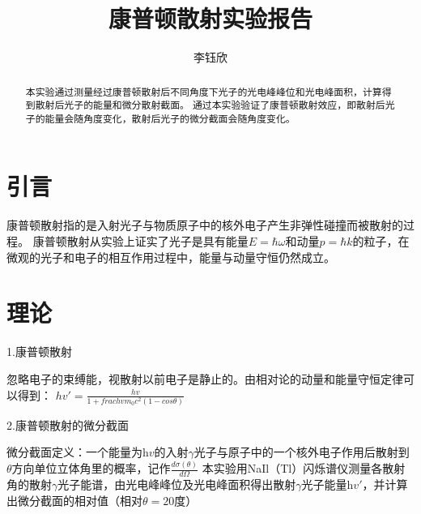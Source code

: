 \documentclass[font=default]{mpltx}
\makeatletter
\newcommand\releasedate{%
    \href{https://github.com/CastleStar14654/PKUMpLtX/releases/tag/\mpltx@fileversion}%
        {\mpltx@filedate, \mpltx@fileversion}}
\makeatother
\begin{document}
\title{康普顿散射实验报告} %
\author{李钰欣} %
\date{}
\begin{abstract}
  本实验通过测量经过康普顿散射后不同角度下光子的光电峰峰位和光电峰面积，计算得到散射后光子的能量和微分散射截面。
  通过本实验验证了康普顿散射效应，即散射后光子的能量会随角度变化，散射后光子的微分截面会随角度变化。
\end{abstract}

\maketitle

\section{引言}

康普顿散射指的是入射光子与物质原子中的核外电子产生非弹性碰撞而被散射的过程。
康普顿散射从实验上证实了光子是具有能量$E = \hbar \omega$和动量$p = \hbar k$的粒子，在微观的光子和电子的相互作用过程中，能量与动量守恒仍然成立。

 
\section{理论}\label{sec:theory}
1.康普顿散射

忽略电子的束缚能，视散射以前电子是静止的。由相对论的动量和能量守恒定律可以得到：
$hv' = \frac{hv}{1+ frac{hv}{m_0 c^2}(1-cos \theta)}$

2.康普顿散射的微分截面

微分截面定义：一个能量为h$v$的入射$\gamma$光子与原子中的一个核外电子作用后散射到$\theta$方向单位立体角里的概率，记作$\frac{d \sigma (\theta)}{d \Omega}$
本实验用NaIl（Tl）闪烁谱仪测量各散射角的散射$\gamma$光子能谱，由光电峰峰位及光电峰面积得出散射$\gamma$光子能量h$v'$，并计算出微分截面的相对值（相对$\theta = 20$度）
\end{document}

